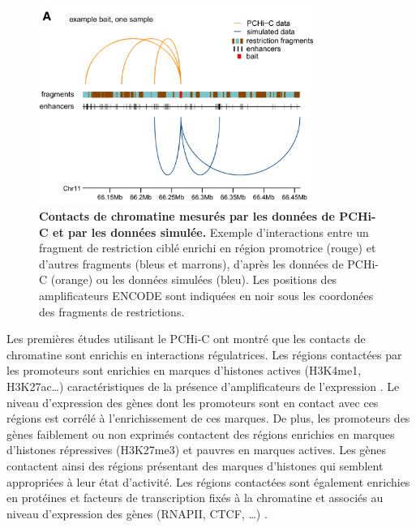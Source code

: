 \begin{figure}[h]
    \centering
    \includegraphics[width=0.8\textwidth, page=1] {figures/chap2/chap2-fig3.png}
    \caption[Contacts de chromatine mesurés par les données de \gls{PCHi-C} et par les données simulée.]{
    \textbf{Contacts de chromatine mesurés par les données de \gls{PCHi-C} et par les données simulée.} Exemple d'interactions entre un fragment de restriction ciblé enrichi en région promotrice (rouge) et d'autres fragments (bleus et marrons), d'après les données de \gls{PCHi-C} (orange) ou les données simulées (bleu). Les positions des amplificateurs ENCODE sont indiquées en noir sous les coordonées des fragments de restrictions. \\
    }
    \label{fig:chap2-fig3}
\end{figure} 

Les premières études utilisant le \gls{PCHi-C} ont montré que les contacts de chromatine sont enrichis en interactions régulatrices. Les régions contactées par les promoteurs sont enrichies en marques d’histones actives (H3K4me1, H3K27ac…) caractéristiques de la présence d’amplificateurs de l’expression \citep{schoenfelder_pluripotent_2015}. Le niveau d’expression des gènes dont les promoteurs sont en contact avec ces régions est corrélé à l’enrichissement de ces marques. De plus, les promoteurs des gènes faiblement ou non exprimés contactent des régions enrichies en marques d’histones répressives (H3K27me3) et pauvres en marques actives. Les gènes contactent ainsi des régions présentant des marques d’histones qui semblent appropriées à leur état d’activité. Les régions contactées sont également enrichies en protéines et facteurs de transcription fixés à la chromatine et associés au niveau d’expression des gènes (RNAPII, CTCF, …) \citep{javierre_lineage-specific_2016}.\\

